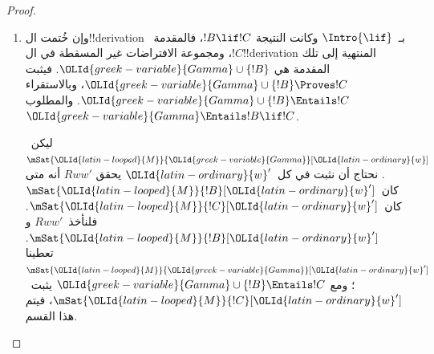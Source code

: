 \documentclass[../../../include/open-logic-section]{subfiles}
\begin{document}
\begin{proof}
\begin{enumerate}
{    ليكن~$\mSat{\OLId{latin-looped}{M}}{\OLId{greek-variable}{Gamma} \cup \OLId{greek-variable}{Delta}_\OLMathNumeral{1} \cup \OLId{greek-variable}{Delta}_\OLMathNumeral{2}}[\OLId{latin-ordinary}{w}]$. فنستخلص
    $\mSat{\OLId{latin-looped}{M}}{\OLId{greek-variable}{Gamma}}[\OLId{latin-ordinary}{w}]$، ومن~$\OLId{greek-variable}{Gamma} \Entails !B \lor !C$ يلزم
    $\mSat{\OLId{latin-looped}{M}}{!B \lor !C}[\OLId{latin-ordinary}{w}]$. وتعريف~$\mSat{\OLId{latin-looped}{M}}{}$ يقسم الأمر قسمين:
    إما~$\mSat{\OLId{latin-looped}{M}}{!B}[\OLId{latin-ordinary}{w}]$ وإما~$\mSat{\OLId{latin-looped}{M}}{!C}[\OLId{latin-ordinary}{w}]$.
    (أ) إن كان~$\mSat{\OLId{latin-looped}{M}}{!B}[\OLId{latin-ordinary}{w}]$، كان
    $\mSat{\OLId{latin-looped}{M}}{\OLId{greek-variable}{Delta}_\OLMathNumeral{1} \cup \{!B\}}[\OLId{latin-ordinary}{w}]$؛ ومع
    $\OLId{greek-variable}{Delta}_\OLMathNumeral{1} \cup \{!B\} \Entails !D$ يثبت~$\mSat{\OLId{latin-looped}{M}}{!D}[\OLId{latin-ordinary}{w}]$.
    (ب) وإن كان~$\mSat{\OLId{latin-looped}{M}}{!C}[\OLId{latin-ordinary}{w}]$، كان
    $\mSat{\OLId{latin-looped}{M}}{\OLId{greek-variable}{Delta}_\OLMathNumeral{2} \cup \{!C\}}[\OLId{latin-ordinary}{w}]$؛ ومع
    $\OLId{greek-variable}{Delta}_\OLMathNumeral{2} \cup \{!C\} \Entails !D$ يثبت~$\mSat{\OLId{latin-looped}{M}}{!D}[\OLId{latin-ordinary}{w}]$.
    فالحاصل على كلا الوجهين~$\mSat{\OLId{latin-looped}{M}}{!D}[\OLId{latin-ordinary}{w}]$، وهذا مرادنا.}

  \item وإن خُتمت ال!!{derivation} بـ~$\Intro{\lif}$ وكانت النتيجة
    $!B \lif !C$، فالمقدمة~$!C$، ومجموعة الافتراضات غير المسقطة في
    ال!!{derivation} المنتهية إلى تلك المقدمة هي
    $\OLId{greek-variable}{Gamma} \cup \{!B\}$. فيثبت
    $\OLId{greek-variable}{Gamma} \cup \{!B\} \Proves !C$، وبالاستقراء
    $\OLId{greek-variable}{Gamma} \cup \{!B\} \Entails !C$. والمطلوب
    $\OLId{greek-variable}{Gamma} \Entails !B \lif !C$.

    ليكن~$\mSat{\OLId{latin-looped}{M}}{\OLId{greek-variable}{Gamma}}[\OLId{latin-ordinary}{w}]$. نحتاج أن نثبت في كل~$\OLId{latin-ordinary}{w}'$ يحقق
    $Rww'$ أنه متى كان~$\mSat{\OLId{latin-looped}{M}}{!B}[\OLId{latin-ordinary}{w}']$ كان~$\mSat{\OLId{latin-looped}{M}}{!C}[\OLId{latin-ordinary}{w}']$.
    فلنأخذ~$Rww'$ و$\mSat{\OLId{latin-looped}{M}}{!B}[\OLId{latin-ordinary}{w}']$. تعطينا
    $\mSat{\OLId{latin-looped}{M}}{\OLId{greek-variable}{Gamma}}[\OLId{latin-ordinary}{w}']$؛ ومع
    $\OLId{greek-variable}{Gamma} \cup \{!B\} \Entails !C$ يثبت~$\mSat{\OLId{latin-looped}{M}}{!C}[\OLId{latin-ordinary}{w}']$،
    فيتم هذا القسم.


\end{enumerate}
\end{proof}
\end{document}
